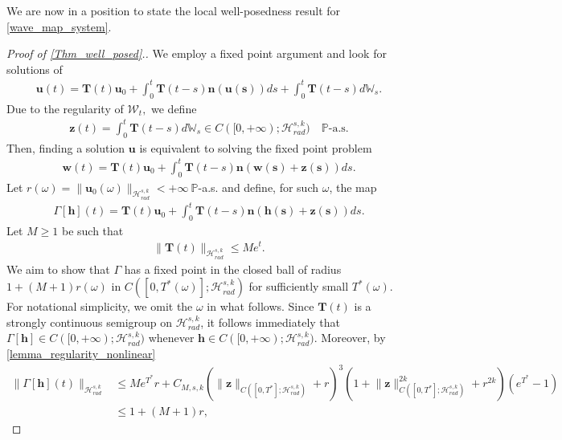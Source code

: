 \documentclass[12pt,reqno]{amsart}
\theoremstyle{plain}
\theoremstyle{remark}
\theoremstyle{plain}
\theoremstyle{definition}
\numberwithin{equation}{section}
\numberwithin{equation}{section}
\newcommand{\HH}{\mathcal{H}}
\begin{document}
We are now in a position to state the local well-posedness result for \eqref{wave_map_system}.
	\begin{proof}[Proof of \autoref{Thm_well_posed}.]
		We employ a fixed point argument and look for solutions of\begin{align*}
			\mathbf{u}(t)=\mathbf{T}(t)\mathbf{u}_0+\int_0^t \mathbf{T}(t-s)\mathbf{n(\mathbf{u}(s))} ds+\int_0^t \mathbf{T}(t-s)d\mathbb{W}_s.
		\end{align*}
		Due to the regularity of $\mathcal{W}_t,$ we define 
        \begin{align*}
        \mathbf{z}(t)=\int_0^t \mathbf{T}(t-s)d\mathbb{W}_s\in C([0,+\infty);\HH_{rad}^{s,k})\quad \mathbb{P}\text{-a.s.}    
        \end{align*}
        Then, finding a solution $\mathbf{u}$ is equivalent to solving the fixed point problem
		\begin{align}\label{fixed_point_problem_v}
			\mathbf{w}(t)=\mathbf{T}(t)\mathbf{u}_0+\int_0^t \mathbf{T}(t-s)\mathbf{n(\mathbf{w}(s)+\mathbf{z}(s))} ds. 
		\end{align}
		Let $r(\omega)=\lVert \mathbf{u}_0(\omega)\rVert_{\HH_{rad}^{s,k}}<+\infty \ \mathbb{P}$-a.s. and define, for such $\omega$, the map
		\begin{align*}
			\Gamma[\mathbf{h}](t)=\mathbf{T}(t)\mathbf{u}_0+\int_0^t \mathbf{T}(t-s)\mathbf{n(\mathbf{h}(s)+\mathbf{z}(s))} ds.
		\end{align*}
		Let $M\geq 1$ be such that 
		\begin{align}\label{growth_wave_semigroup}
			\lVert \mathbf{T}(t)\rVert_{\HH_{rad}^{s,k}}\leq M e^t.
		\end{align}
		We aim to show that $\Gamma$ has a fixed point in the closed ball of radius $1 + (M+1) r(\omega)$ in $C([0,T^*(\omega)]; \HH_{rad}^{s,k})$ for sufficiently small $T^*(\omega)$. For notational simplicity, we omit the $\omega$ in what follows. Since $\mathbf{T}(t)$ is a strongly continuous semigroup on $\HH_{rad}^{s,k}$, it follows immediately that $\Gamma[\mathbf{h}]\in C([0,+\infty);\HH_{rad}^{s,k})$ whenever $\mathbf{h}\in C([0,+\infty);\HH_{rad}^{s,k})$. Moreover, by \autoref{lemma_regularity_nonlinear}
		\begin{align*}
			\lVert\Gamma [\mathbf{h}](t)\rVert_{\HH_{rad}^{s,k}}&\leq M e^{T^*} r+C_{M,s,k}\left(\lVert \mathbf{z}\rVert_{C([0,T^*];\HH_{rad}^{s,k})}+r\right)^3(1+\lVert \mathbf{z}\rVert_{C([0,T^*];\HH_{rad}^{s,k})}^{2k}+r^{2k})(e^{T^*}-1)\\ & \leq  1+(M+1)r,
		\end{align*}

\end{proof}
\end{document}

